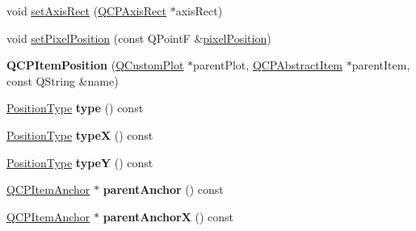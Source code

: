 \begin{DoxyCompactItemize}
\item 
void \hyperlink{class_q_c_p_item_position_a0cd9b326fb324710169e92e8ca0041c2}{set\+Axis\+Rect} (\hyperlink{class_q_c_p_axis_rect}{Q\+C\+P\+Axis\+Rect} $\ast$axis\+Rect)
\item 
void \hyperlink{class_q_c_p_item_position_a8d4f858f2089973967cf9cb81970ef0a}{set\+Pixel\+Position} (const Q\+PointF \&\hyperlink{class_q_c_p_item_position_a247e99435d88ddd73c08fad3aebd4e8d}{pixel\+Position})
\item 
{\bfseries Q\+C\+P\+Item\+Position} (\hyperlink{class_q_custom_plot}{Q\+Custom\+Plot} $\ast$parent\+Plot, \hyperlink{class_q_c_p_abstract_item}{Q\+C\+P\+Abstract\+Item} $\ast$parent\+Item, const Q\+String \&name)\hypertarget{class_q_c_p_item_position_a6519a552bd9766354644ec24d1f26622}{}\label{class_q_c_p_item_position_a6519a552bd9766354644ec24d1f26622}

\item 
\hyperlink{class_q_c_p_item_position_aad9936c22bf43e3d358552f6e86dbdc8}{Position\+Type} {\bfseries type} () const \hypertarget{class_q_c_p_item_position_ad64a1a26fbed5b8917e0eb8843099fd6}{}\label{class_q_c_p_item_position_ad64a1a26fbed5b8917e0eb8843099fd6}

\item 
\hyperlink{class_q_c_p_item_position_aad9936c22bf43e3d358552f6e86dbdc8}{Position\+Type} {\bfseries typeX} () const \hypertarget{class_q_c_p_item_position_a3cb68cf9c95be05c66a0f47448e328e5}{}\label{class_q_c_p_item_position_a3cb68cf9c95be05c66a0f47448e328e5}

\item 
\hyperlink{class_q_c_p_item_position_aad9936c22bf43e3d358552f6e86dbdc8}{Position\+Type} {\bfseries typeY} () const \hypertarget{class_q_c_p_item_position_a8a2fec9dec1ce006a598b32685fd7ab3}{}\label{class_q_c_p_item_position_a8a2fec9dec1ce006a598b32685fd7ab3}

\item 
\hyperlink{class_q_c_p_item_anchor}{Q\+C\+P\+Item\+Anchor} $\ast$ {\bfseries parent\+Anchor} () const \hypertarget{class_q_c_p_item_position_a0db87cc41efabc1cf94acee7ebe14eee}{}\label{class_q_c_p_item_position_a0db87cc41efabc1cf94acee7ebe14eee}

\item 
\hyperlink{class_q_c_p_item_anchor}{Q\+C\+P\+Item\+Anchor} $\ast$ {\bfseries parent\+AnchorX} () const \hypertarget{class_q_c_p_item_position_a485abba71c8552086c5f68e95dca7f9a}{}\label{class_q_c_p_item_position_a485abba71c8552086c5f68e95dca7f9a}


\end{DoxyCompactItemize}
